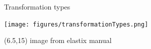 \documentclass[aspectratio=169]{beamer}
\newcommand{\code}[1]{\texttt{#1}}
\newcommand\citefoot[1]{
    \begin{textblock}{12}(6.5,15)
        {\color{HHMIGrayB} \tiny #1}
    \end{textblock}
}
\begin{document}
\begin{frame}{Transformation types}

    \vspace{1.0em}
    \begin{center}
        \texttt{[image: figures/transformationTypes.png]} \\
    \end{center}

    \citefoot{image from elastix manual}
\end{frame}


%
%
\end{document}
